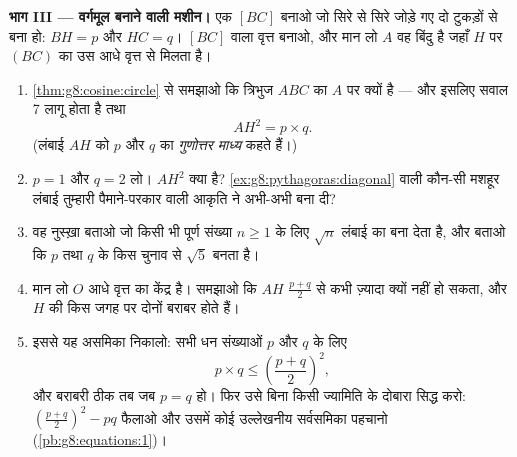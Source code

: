 \begin{problem}[{सप्ताहांत समस्या --- समकोण त्रिभुज का शीर्षलंब:
$AB^2 = BH \times BC$, $AH^2 = BH \times HC$, पाइथागोरस का दूसरा
प्रमाण, और वर्गमूल बनाने वाली एक मशीन}]
\medskip
\noindent\textbf{भाग III --- वर्गमूल बनाने वाली मशीन।}
एक  $[BC]$ बनाओ जो सिरे से सिरे जोड़े गए दो टुकड़ों से बना
हो: $BH = p$ और $HC = q$।  $[BC]$ वाला  वृत्त बनाओ, और मान
लो $A$ वह बिंदु है जहाँ $H$ पर $(BC)$ का  उस आधे वृत्त से मिलता
है।
\begin{enumerate}[resume]
  \item \cref{thm:g8:cosine:circle} से समझाओ कि त्रिभुज $ABC$ का
        $A$ पर  क्यों है --- और इसलिए सवाल 7 लागू होता है तथा
        \[
        AH^2 = p \times q .
        \]
        (लंबाई $AH$ को $p$ और $q$ का \emph{गुणोत्तर
        माध्य} कहते हैं।)
  \item $p = 1$ और $q = 2$ लो। $AH^2$ क्या है?
        \cref{ex:g8:pythagoras:diagonal} वाली कौन-सी मशहूर लंबाई
        तुम्हारी पैमाने-परकार वाली आकृति ने अभी-अभी बना दी?
  \item वह नुस्ख़ा बताओ जो किसी भी पूर्ण संख्या $n \geq 1$ के लिए
        $\sqrt n$ लंबाई का  बना देता है, और बताओ कि $p$
        तथा $q$ के किस चुनाव से $\sqrt 5$ बनता है।
  \item मान लो $O$ आधे वृत्त का केंद्र है। समझाओ कि $AH$ 
        $\frac{p + q}{2}$ से कभी ज़्यादा क्यों नहीं हो सकता, और
        $H$ की किस जगह पर दोनों बराबर होते हैं।
  \item इससे यह असमिका निकालो: सभी धन संख्याओं $p$ और $q$ के लिए
        \[
        p \times q \leq \left(\frac{p + q}{2}\right)^2,
        \]
        और बराबरी ठीक तब जब $p = q$ हो। फिर उसे बिना किसी ज्यामिति
        के दोबारा सिद्ध करो: $\left(\frac{p+q}{2}\right)^2 - p q$
        फैलाओ और उसमें कोई उल्लेखनीय सर्वसमिका पहचानो
        (\cref{pb:g8:equations:1})।
\end{enumerate}
\end{problem}
